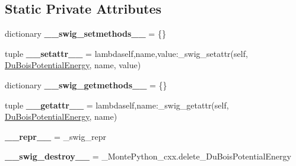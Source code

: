 \subsection*{Static Private Attributes}
\begin{DoxyCompactItemize}
\item 
\hypertarget{classMontePython__cxx_1_1DuBoisPotentialEnergy_ada69a71b53db57879a7dfd3165f64f6e}{}dictionary {\bfseries \+\_\+\+\_\+swig\+\_\+setmethods\+\_\+\+\_\+} = \{\}\label{classMontePython__cxx_1_1DuBoisPotentialEnergy_ada69a71b53db57879a7dfd3165f64f6e}

\item 
\hypertarget{classMontePython__cxx_1_1DuBoisPotentialEnergy_a1d89f790e102b695f5c009cd2f5e9e6e}{}tuple {\bfseries \+\_\+\+\_\+setattr\+\_\+\+\_\+} = lambdaself,name,value\+:\+\_\+swig\+\_\+setattr(self, \hyperlink{classMontePython__cxx_1_1DuBoisPotentialEnergy}{Du\+Bois\+Potential\+Energy}, name, value)\label{classMontePython__cxx_1_1DuBoisPotentialEnergy_a1d89f790e102b695f5c009cd2f5e9e6e}

\item 
\hypertarget{classMontePython__cxx_1_1DuBoisPotentialEnergy_a3d4f8a747638b8d6e7621c11d788994a}{}dictionary {\bfseries \+\_\+\+\_\+swig\+\_\+getmethods\+\_\+\+\_\+} = \{\}\label{classMontePython__cxx_1_1DuBoisPotentialEnergy_a3d4f8a747638b8d6e7621c11d788994a}

\item 
\hypertarget{classMontePython__cxx_1_1DuBoisPotentialEnergy_a20c7ceb0e44360647823cccf022ae68f}{}tuple {\bfseries \+\_\+\+\_\+getattr\+\_\+\+\_\+} = lambdaself,name\+:\+\_\+swig\+\_\+getattr(self, \hyperlink{classMontePython__cxx_1_1DuBoisPotentialEnergy}{Du\+Bois\+Potential\+Energy}, name)\label{classMontePython__cxx_1_1DuBoisPotentialEnergy_a20c7ceb0e44360647823cccf022ae68f}

\item 
\hypertarget{classMontePython__cxx_1_1DuBoisPotentialEnergy_a16b959379f4753ebb27e814a45dbed72}{}{\bfseries \+\_\+\+\_\+repr\+\_\+\+\_\+} = \+\_\+swig\+\_\+repr\label{classMontePython__cxx_1_1DuBoisPotentialEnergy_a16b959379f4753ebb27e814a45dbed72}

\item 
\hypertarget{classMontePython__cxx_1_1DuBoisPotentialEnergy_ac8db1e7f07c3730024bc87bdf8d152f3}{}{\bfseries \+\_\+\+\_\+swig\+\_\+destroy\+\_\+\+\_\+} = \+\_\+\+Monte\+Python\+\_\+cxx.\+delete\+\_\+\+Du\+Bois\+Potential\+Energy\label{classMontePython__cxx_1_1DuBoisPotentialEnergy_ac8db1e7f07c3730024bc87bdf8d152f3}

\end{DoxyCompactItemize}


